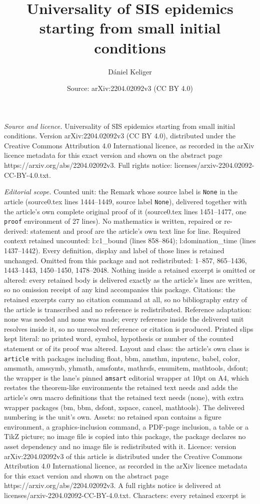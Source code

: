 \documentclass[10pt,a4paper]{amsart}
\title[Universality of SIS epidemics starting from small initial co]{Universality of SIS epidemics starting from small initial conditions}
\author{D\'aniel Keliger}
\date{Source: arXiv:2204.02092v3 (CC BY 4.0)}
\begin{document}
\maketitle

\noindent\emph{Source and licence.} Universality of SIS epidemics starting from small initial conditions. Version arXiv:2204.02092v3 (CC BY 4.0), distributed under the Creative Commons Attribution 4.0 International licence, as recorded in the arXiv licence metadata for this exact version and shown on the abstract page https://arxiv.org/abs/2204.02092v3. Full rights notice: licenses/arxiv-2204.02092-CC-BY-4.0.txt.\par\smallskip

\noindent\textit{Editorial scope.} Counted unit: the Remark whose source label is \texttt{None} in the article (source0.tex lines 1444--1449, source label \texttt{None}), delivered together with the article's own complete original proof of it (source0.tex lines 1451--1477, one \texttt{proof} environment of 27 lines). No mathematics is written, repaired or re-derived: statement and proof are the article's own text line for line. Required context retained uncounted: l:c1\_bound (lines 858--864); l:domination\_time (lines 1437--1442). Every definition, display and label of those lines is retained unchanged. Omitted from this package and not redistributed: 1--857, 865--1436, 1443--1443, 1450--1450, 1478--2048. Nothing inside a retained excerpt is omitted or altered: every retained body is delivered exactly as the article's lines are written, so no omission receipt of any kind accompanies this package. Citations: the retained excerpts carry no citation command at all, so no bibliography entry of the article is transcribed and no reference is redistributed. Reference adaptation: none was needed and none was made; every reference inside the delivered unit resolves inside it, so no unresolved reference or citation is produced. Printed slips kept literal: no printed word, symbol, hypothesis or number of the counted statement or of its proof was altered. Layout and class: the article's own class is \texttt{article} with packages including float, bbm, amsthm, inputenc, babel, color, amsmath, amssymb, yhmath, amsfonts, mathrsfs, enumitem, mathtools, dsfont; the wrapper is the lane's pinned \texttt{amsart} editorial wrapper at 10pt on A4, which restates the theorem-like environments the retained text needs and adds the article's own macro definitions that the retained text needs (none), with extra wrapper packages (bm, bbm, dsfont, xspace, cancel, mathtools). The delivered numbering is the unit's own. Assets: no retained span contains a figure environment, a graphics-inclusion command, a PDF-page inclusion, a table or a TikZ picture; no image file is copied into this package, the package declares no asset dependency and no image file is redistributed with it. Licence: version arXiv:2204.02092v3 of this article is distributed under the Creative Commons Attribution 4.0 International licence, as recorded in the arXiv licence metadata for this exact version and shown on the abstract page https://arxiv.org/abs/2204.02092v3. A full rights notice is delivered at licenses/arxiv-2204.02092-CC-BY-4.0.txt. Characters: every retained excerpt is 
\end{document}
